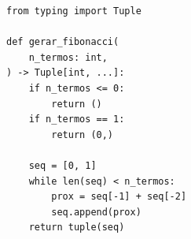 \ifmostrarGabarito
\begin{verbatim}
from typing import Tuple

def gerar_fibonacci(
    n_termos: int,
) -> Tuple[int, ...]:
    if n_termos <= 0:
        return ()
    if n_termos == 1:
        return (0,)
    
    seq = [0, 1]
    while len(seq) < n_termos:
        prox = seq[-1] + seq[-2]
        seq.append(prox)
    return tuple(seq)
\end{verbatim}

\fi
